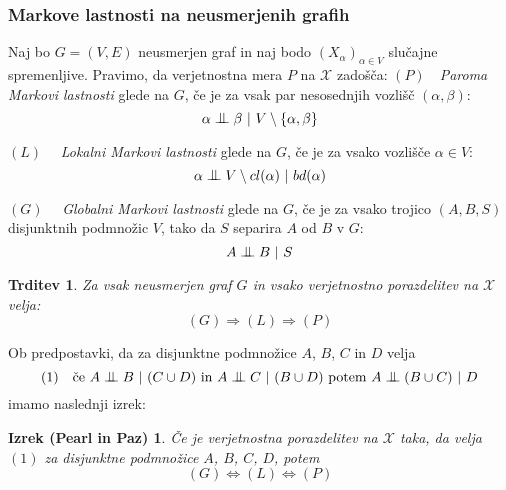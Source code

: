 \documentclass{beamer}
\newtheorem{trditev}[definicija]{Trditev}
\newtheorem{izrek_p_z}[izrek]{Izrek (Pearl in Paz)}
\newcommand{\cond}{\mathrel{\text{\scalebox{1.07}{$\perp\mkern-10mu\perp$}}}}
\begin{document}
\begin{frame}
    \frametitle{Markove lastnosti na neusmerjenih grafih}
    Naj bo $G = (V,E)$ neusmerjen graf in naj bodo $ (X_\alpha)_{\alpha \in V} $
    slučajne spremenljive. Pravimo, da verjetnostna mera $P$ na $\mathcal{X}$ zadošča: 
    \newline \newline
    $(P) \quad $\emph{Paroma Markovi lastnosti} glede na $G$, če je za 
    vsak par nesosednjih vozlišč $(\alpha, \beta)$: 
    $$ \alpha \cond \beta ~|~ V \setminus \{\alpha, \beta\}   $$

    $(L) \quad $ \emph{Lokalni Markovi lastnosti} glede na $G$, če je za 
    vsako vozlišče $\alpha \in V$:
    $$ \alpha \cond V \setminus cl(\alpha) ~|~ bd(\alpha) $$ 

    $(G) \quad $ \emph{Globalni Markovi lastnosti} glede na $G$, če je za 
    vsako trojico $(A, B, S)$ disjunktnih podmnožic $V$, tako da $S$ 
    separira $A$ od $B$ v $G$:
    \[ A \cond B ~|~ S \] 

\end{frame}
\begin{frame}
    \begin{trditev}
        Za vsak neusmerjen graf $G$ in vsako verjetnostno porazdelitev na $\mathcal{X}$ velja:
        $$ (G) \Longrightarrow (L) \Longrightarrow (P) $$
    \end{trditev}
    Ob predpostavki, da za disjunktne podmnožice $A$, $B$, $C$ in $D$ velja
    $$(1) \quad \text{če} ~A \cond B ~|~ (C \cup D) ~\text{in}~ A \cond C ~|~ (B \cup D) ~ \text{potem} ~ A \cond (B \cup C) ~|~ D $$
    imamo naslednji izrek:
    \begin{izrek_p_z}
        Če je verjetnostna porazdelitev na $\mathcal{X} $ taka, da velja $(1)$ za disjunktne
        podmnožice $A$, $B$, $C$, $D$, potem 
        $$ (G) \Longleftrightarrow (L) \Longleftrightarrow (P)$$
    \end{izrek_p_z}
\end{frame}
\end{document}

